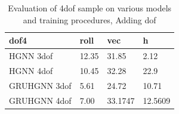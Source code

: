 \begin{table}[h!]
	\centering
	\caption{Evaluation of 4dof sample on various models and training procedures, Adding dof} %
	\label{tab:my_label}               %
	\begin{tabular}{|l|l|l|l|}
		\hline
		dof4 & roll & vec & h\\ 
		\hline
		HGNN 3dof & 12.35 & 31.85 & 2.12 \\  
		\hline
		HGNN 4dof & 10.45 & 32.28 & 22.9 \\  
		\hline
		GRUHGNN 3dof & 5.61 & 24.72 & 10.71 \\  
		\hline
		GRUHGNN 4dof & 7.00 & 33.1747 & 12.5609 \\  
		\hline
	\end{tabular}
\end{table}







